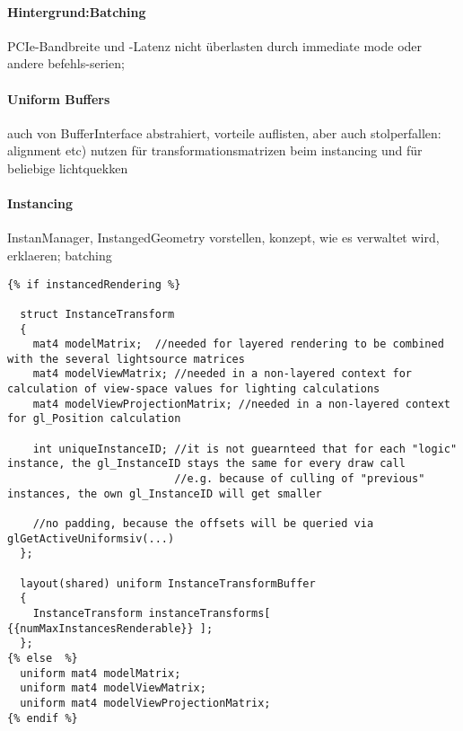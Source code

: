 	\paragraph{Hintergrund:Batching}
	PCIe-Bandbreite und -Latenz nicht überlasten durch immediate mode oder andere befehls-serien;

	\paragraph{Uniform Buffers}
	auch von BufferInterface abstrahiert, vorteile auflisten, aber auch stolperfallen: alignment etc)	
	nutzen für transformationsmatrizen beim instancing und für beliebige lichtquekken

	
	\paragraph{Instancing}
	\label{sec:instancing}
	InstanManager, InstangedGeometry vorstellen, konzept, wie es verwaltet wird, erklaeren;
	batching
 	\lstset{language=GLSL}
 	\begin{lstlisting}[caption={Transformationsmatrizen-Uniforms im Vertex Shader},label=listing:VertShaderTransformDef]
{% if instancedRendering %}

  struct InstanceTransform
  {
    mat4 modelMatrix;  //needed for layered rendering to be combined with the several lightsource matrices
    mat4 modelViewMatrix; //needed in a non-layered context for calculation of view-space values for lighting calculations
    mat4 modelViewProjectionMatrix; //needed in a non-layered context for gl_Position calculation
    
    int uniqueInstanceID; //it is not guearnteed that for each "logic" instance, the gl_InstanceID stays the same for every draw call
                          //e.g. because of culling of "previous" instances, the own gl_InstanceID will get smaller 
    
    //no padding, because the offsets will be queried via glGetActiveUniformsiv(...)
  };

  layout(shared) uniform InstanceTransformBuffer
  {
    InstanceTransform instanceTransforms[  {{numMaxInstancesRenderable}} ];
  };
{% else  %}
  uniform mat4 modelMatrix;
  uniform mat4 modelViewMatrix;
  uniform mat4 modelViewProjectionMatrix; 
{% endif %}
 	\end{lstlisting}
 	\lstset{language=C++} %
	
